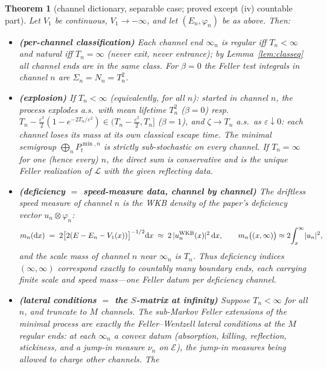 \documentclass[11pt]{article}
\newtheorem{theorem}{Theorem}
\theoremstyle{remark}
\newcommand{\dd}{\mathrm{d}}
\newcommand{\calE}{\mathcal{E}}
\begin{document}
\begin{theorem}[channel dictionary, separable case; proved except (iv)
countable part]\label{thm:A}
Let $V_{1}$ be continuous, $V_{1}\to-\infty$, and let
$(E_{n},\varphi_{n})$ be as above.  Then:
\begin{itemize}
\item[(i)] \textbf{(per-channel classification)}  Each channel end
$\infty_{n}$ is \emph{regular} iff $T_{n}<\infty$ and \emph{natural}
iff $T_{n}=\infty$ (never exit, never entrance); by
Lemma~\ref{lem:classeq} all channel ends are in the same class.  For
$\beta=0$ the Feller test integrals in channel $n$ are
$\Sigma_{n}=N_{n}=T_{n}^{2}$.
\item[(ii)] \textbf{(explosion)}  If $T_{n}<\infty$ (equivalently, for
all $n$): started in channel $n$, the process explodes a.s.\ with mean
lifetime $T_{n}^{2}$ ($\beta=0$) resp.\
$T_{n}-\tfrac{\varepsilon^{2}}{2}(1-e^{-2T_{n}/\varepsilon^{2}})
\in(T_{n}-\tfrac{\varepsilon^{2}}{2},T_{n}]$ ($\beta=1$), and
$\zeta\to T_{n}$ a.s.\ as $\varepsilon\downarrow0$: \emph{each channel
loses its mass at its own classical escape time}.  The minimal
semigroup $\bigoplus_{n}P^{\min,n}_{t}$ is strictly sub-stochastic on
every channel.  If $T_{n}=\infty$ for one (hence every) $n$, the direct
sum is conservative and is the unique Feller realization of
$\mathcal L$ with the given reflecting data.
\item[(iii)] \textbf{(deficiency $=$ speed-measure data, channel by
channel)}  The driftless speed measure of channel $n$ is the WKB
density of the paper's deficiency vector $u_{n}\otimes\varphi_{n}$:
\[
m_{n}(\dd x)\;=\;2\bigl[2(E-E_{n}-V_{1}(x))\bigr]^{-1/2}\dd x
\;\approx\;2\,|u_{n}^{\rm WKB}(x)|^{2}\,\dd x,
\qquad
m_{n}\bigl((x,\infty)\bigr)\approx
2\!\int_{x}^{\infty}\!|u_{n}|^{2},
\]
and the scale mass of channel $n$ near $\infty_{n}$ is $T_{n}$.  Thus
deficiency indices $(\infty,\infty)$ correspond exactly to
\emph{countably many boundary ends, each carrying finite scale and
speed mass}---one Feller datum per deficiency channel.
\item[(iv)] \textbf{(lateral conditions $=$ the $S$-matrix at
infinity)}  Suppose $T_{n}<\infty$ for all $n$, and truncate to $M$
channels.  The sub-Markov Feller extensions of the minimal process are
exactly the Feller--Wentzell lateral conditions at the $M$ regular ends:
at each $\infty_{n}$ a convex datum (absorption, killing, reflection,
stickiness, and a jump-in measure $\nu_{n}$ on $\calE$), the jump-in
measures being allowed to charge \emph{other} channels.  The

\end{itemize}
\end{theorem}
\end{document}
